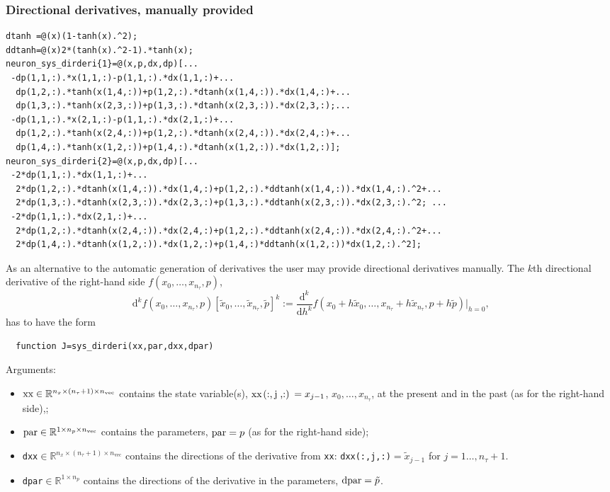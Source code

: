 \documentclass[10pt]{scrartcl}
\renewcommand{\d}{\mathrm{d}}
\newcommand{\RR}{\mathbb{R}}
\newcommand{\blist}[1]{\mbox{\lstinline!#1!}}
\begin{document}
\subsubsection{Directional derivatives, manually provided}
\label{sec:dirderi}
\begin{lstlisting}[float,floatplacement=t,frame=lines,label=neuron_sys_dirderi,caption={First two directional derivatives of right-hand side of \cref{example_sys} (vectorized, see \url{../demos/neuron/html/demo1_funcs.html} and note that
 provision of this pair of functions is less complex than the routine
 for \blist{neuron_sys_deri} required in previous versions.)}]
dtanh =@(x)(1-tanh(x).^2);
ddtanh=@(x)2*(tanh(x).^2-1).*tanh(x);
neuron_sys_dirderi{1}=@(x,p,dx,dp)[...
 -dp(1,1,:).*x(1,1,:)-p(1,1,:).*dx(1,1,:)+...
  dp(1,2,:).*tanh(x(1,4,:))+p(1,2,:).*dtanh(x(1,4,:)).*dx(1,4,:)+...
  dp(1,3,:).*tanh(x(2,3,:))+p(1,3,:).*dtanh(x(2,3,:)).*dx(2,3,:);...
 -dp(1,1,:).*x(2,1,:)-p(1,1,:).*dx(2,1,:)+...
  dp(1,2,:).*tanh(x(2,4,:))+p(1,2,:).*dtanh(x(2,4,:)).*dx(2,4,:)+...
  dp(1,4,:).*tanh(x(1,2,:))+p(1,4,:).*dtanh(x(1,2,:)).*dx(1,2,:)];
neuron_sys_dirderi{2}=@(x,p,dx,dp)[...
 -2*dp(1,1,:).*dx(1,1,:)+...
  2*dp(1,2,:).*dtanh(x(1,4,:)).*dx(1,4,:)+p(1,2,:).*ddtanh(x(1,4,:)).*dx(1,4,:).^2+...
  2*dp(1,3,:).*dtanh(x(2,3,:)).*dx(2,3,:)+p(1,3,:).*ddtanh(x(2,3,:)).*dx(2,3,:).^2; ...
 -2*dp(1,1,:).*dx(2,1,:)+...
  2*dp(1,2,:).*dtanh(x(2,4,:)).*dx(2,4,:)+p(1,2,:).*ddtanh(x(2,4,:)).*dx(2,4,:).^2+...
  2*dp(1,4,:).*dtanh(x(1,2,:)).*dx(1,2,:)+p(1,4,:)*ddtanh(x(1,2,:))*dx(1,2,:).^2];
 \end{lstlisting}
As an alternative to the automatic generation of derivatives the user may
provide directional derivatives manually. The $k$th directional derivative of
the right-hand side $f(x_0,\ldots,x_{n_\tau},p)$,
\begin{displaymath}
  \d^kf(x_0,\ldots,x_{n_\tau},p)[\tilde{x}_0,\ldots,\tilde{x}_{n_\tau},\tilde{p}]^k:=
  \frac{\d^k}{\d h^k}f(x_0+h\tilde{x}_0,\ldots,x_{n_\tau}+h\tilde{x}_{n_\tau},p+h\tilde{p})\vert_{h=0}\mbox{,}
\end{displaymath}
 has to have the form
\begin{lstlisting}
  function J=sys_dirderi(xx,par,dxx,dpar)
\end{lstlisting}
Arguments:
\begin{itemize}
\item $\blist{xx}\in\RR^{n_x\times (n_\tau+1)\times n_\mathrm{vec}}$ contains the state
  variable(s), $\blist{xx(:,j,:)}=x_{j-1}$, $x_0,\ldots,x_{n_\tau}$, at the present and in the past (as
  for the right-hand side),;
\item $\blist{par}\in\RR^{1\times
  n_p\times n_\mathrm{vec}}$ contains the parameters, $\blist{par}=p$  (as for the right-hand side);
\item \blist{dxx}$\in\RR^{n_x\times(n_\tau+1)\times n_\mathrm{vec}}$ contains the directions of the derivative from
  \blist{xx}: \blist{dxx(:,j,:)}$=\tilde{x}_{j-1}$ for
    $j=1\ldots,n_\tau+1$.
\item \blist{dpar}$\in\RR^{1\times
  n_p}$ contains the directions of the derivative in the parameters, $\blist{dpar}=\tilde{p}$.
\end{itemize}
\end{document}
